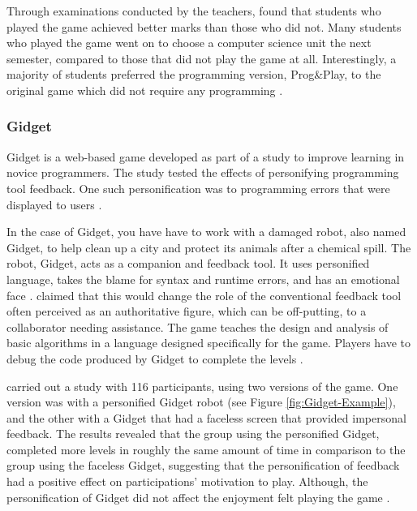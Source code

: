 \documentclass[a4paper,11.5pt]{report}
\numberwithin{figure}{section}
\numberwithin{table}{section}
\numberwithin{equation}{section}
\numberwithin{equation}{section}
\begin{document}
Through examinations conducted by the teachers, \citeauthor{muratet2011} found that students who played the game achieved better marks than those who did not. Many students who played the game went on to choose a computer science unit the next semester, compared to those that did not play the game at all. Interestingly, a majority of students preferred the programming version, Prog\&Play, to the original game which did not require any programming \citep{muratet2011}.


\subsubsection*{Gidget}

Gidget is a web-based game developed as part of a study to improve learning in novice programmers. The study tested the effects of personifying programming tool feedback. One such personification was to programming errors that were displayed to users \citep{lee2011}. 

In the case of Gidget, you have have to work with a damaged robot, also named Gidget, to help clean up a city and protect its animals after a chemical spill. The robot, Gidget, acts as a companion and feedback tool. It uses personified language, takes the blame for syntax and runtime errors, and has an emotional face \citep{lee2011}. \citeauthor{lee2011} claimed that this would change the role of the conventional feedback tool often perceived as an authoritative figure, which can be off-putting, to a collaborator needing assistance. The game teaches the design and analysis of basic algorithms in a language designed specifically for the game. Players have to debug the code produced by Gidget to complete the levels \citep{lee2011}.

\citeauthor{lee2011} carried out a study with 116 participants, using two versions of the game. One version was with a personified Gidget robot (see Figure \ref{fig:Gidget-Example}), and the other with a Gidget that had a faceless screen that provided impersonal feedback. The results revealed that the group using the personified Gidget, completed more levels in roughly the same amount of time in comparison to the group using the faceless Gidget, suggesting that the personification of feedback had a positive effect on participations' motivation to play. Although, the personification of Gidget did not affect the enjoyment felt playing the game \citep{lee2011}.
\end{document}
